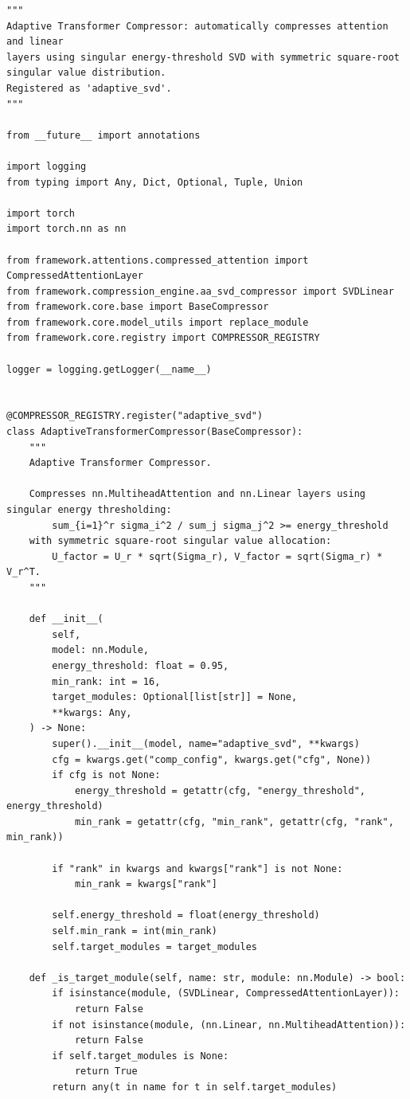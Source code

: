 \begin{lstlisting}
"""
Adaptive Transformer Compressor: automatically compresses attention and linear
layers using singular energy-threshold SVD with symmetric square-root singular value distribution.
Registered as 'adaptive_svd'.
"""

from __future__ import annotations

import logging
from typing import Any, Dict, Optional, Tuple, Union

import torch
import torch.nn as nn

from framework.attentions.compressed_attention import CompressedAttentionLayer
from framework.compression_engine.aa_svd_compressor import SVDLinear
from framework.core.base import BaseCompressor
from framework.core.model_utils import replace_module
from framework.core.registry import COMPRESSOR_REGISTRY

logger = logging.getLogger(__name__)


@COMPRESSOR_REGISTRY.register("adaptive_svd")
class AdaptiveTransformerCompressor(BaseCompressor):
    """
    Adaptive Transformer Compressor.

    Compresses nn.MultiheadAttention and nn.Linear layers using singular energy thresholding:
        sum_{i=1}^r sigma_i^2 / sum_j sigma_j^2 >= energy_threshold
    with symmetric square-root singular value allocation:
        U_factor = U_r * sqrt(Sigma_r), V_factor = sqrt(Sigma_r) * V_r^T.
    """

    def __init__(
        self,
        model: nn.Module,
        energy_threshold: float = 0.95,
        min_rank: int = 16,
        target_modules: Optional[list[str]] = None,
        **kwargs: Any,
    ) -> None:
        super().__init__(model, name="adaptive_svd", **kwargs)
        cfg = kwargs.get("comp_config", kwargs.get("cfg", None))
        if cfg is not None:
            energy_threshold = getattr(cfg, "energy_threshold", energy_threshold)
            min_rank = getattr(cfg, "min_rank", getattr(cfg, "rank", min_rank))

        if "rank" in kwargs and kwargs["rank"] is not None:
            min_rank = kwargs["rank"]

        self.energy_threshold = float(energy_threshold)
        self.min_rank = int(min_rank)
        self.target_modules = target_modules

    def _is_target_module(self, name: str, module: nn.Module) -> bool:
        if isinstance(module, (SVDLinear, CompressedAttentionLayer)):
            return False
        if not isinstance(module, (nn.Linear, nn.MultiheadAttention)):
            return False
        if self.target_modules is None:
            return True
        return any(t in name for t in self.target_modules)


\end{lstlisting}
